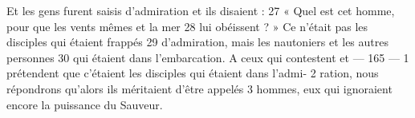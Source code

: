 Et les gens furent saisis d'admiration et ils disaient :	 
27	 	« Quel est cet homme, pour que les vents mêmes et la mer	 
28	 	lui obéissent ? » Ce n'était pas les disciples qui étaient frappés	 
29	 	d'admiration, mais les nautoniers et les autres personnes	 
30	 	qui étaient dans l'embarcation. A ceux qui contestent et	 
 	--- 165 ---	 
1	 	prétendent que c'étaient les disciples qui étaient dans l'admi-	 
2	 	ration, nous répondrons qu'alors ils méritaient d'être appelés	 
3	 	hommes, eux qui ignoraient encore la puissance du Sauveur.